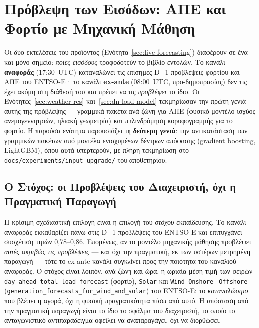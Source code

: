 \section{Πρόβλεψη των Εισόδων: ΑΠΕ και Φορτίο με Μηχανική Μάθηση}
\label{sec:input-prediction}

Οι δύο εκτελέσεις του προϊόντος (Ενότητα~\ref{sec:live-forecasting}) διαφέρουν σε ένα και μόνο σημείο: \emph{ποιες εισόδους} τροφοδοτούν το βιβλίο εντολών. Το κανάλι \textbf{αναφοράς} (17:30~UTC) καταναλώνει τις επίσημες D$-$1 προβλέψεις φορτίου και ΑΠΕ του ENTSO-E· το κανάλι \textbf{ex-ante} (08:00~UTC, προ-δημοπρασίας) δεν τις έχει ακόμη στη διάθεσή του και πρέπει να τις \emph{προβλέψει} το ίδιο. Οι Ενότητες~\ref{sec:weather-res} και~\ref{sec:dn-load-model} τεκμηρίωσαν την πρώτη γενιά αυτής της πρόβλεψης --- γραμμικά πακέτα ανά ζώνη για ΑΠΕ (φυσικό μοντέλο ισχύος ανεμογεννητριών, ηλιακή γεωμετρία) και παλινδρόμηση κορυφογραμμής για το φορτίο. Η παρούσα ενότητα παρουσιάζει τη \textbf{δεύτερη γενιά}: την αντικατάσταση των γραμμικών πακέτων από μοντέλα ενισχυμένων δέντρων απόφασης (gradient boosting, LightGBM), όπου αυτά υπερτερούν, με πλήρη τεκμηρίωση στο \texttt{docs/experiments/input-upgrade/} του αποθετηρίου.

\subsection{Ο Στόχος: οι Προβλέψεις του Διαχειριστή, όχι η Πραγματική Παραγωγή}
\label{subsec:input-target}

Η κρίσιμη σχεδιαστική επιλογή είναι η επιλογή του \emph{στόχου} εκπαίδευσης. Το κανάλι αναφοράς εκκαθαρίζει πάνω στις D$-$1 προβλέψεις του ENTSO-E και επιτυγχάνει συσχέτιση τιμών 0,78--0,86. Επομένως, αν το μοντέλο μηχανικής μάθησης προβλέψει \emph{αυτές ακριβώς τις προβλέψεις} --- και όχι την πραγματική, εκ των υστέρων μετρημένη παραγωγή --- τότε το ex-ante κανάλι συγκλίνει προς την ποιότητα του καναλιού αναφοράς. Ο στόχος είναι λοιπόν, ανά ζώνη και ώρα, η ωριαία μέση τιμή των σειρών \texttt{day\_ahead\_total\_load\_forecast} (φορτίο), \texttt{Solar} και \texttt{Wind Onshore$+$Offshore} (\texttt{generation\_forecasts\_for\_wind\_and\_solar}) του ENTSO-E: το \emph{καταναλώσιμο} που βλέπει η αγορά, όχι η φυσική πραγματικότητα πίσω από αυτό. Η απόσταση από την πραγματική παραγωγή είναι το ίδιο το σφάλμα του διαχειριστή, το οποίο το ανταγωνιστικό αντιπαράδειγμα οφείλει να αναπαραγάγει, όχι να διορθώσει.

